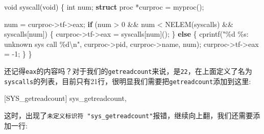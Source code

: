 \documentclass[
]{article}
\newenvironment{Shaded}{}{}
\newcommand{\ControlFlowTok}[1]{\textcolor[rgb]{0.00,0.44,0.13}{\textbf{#1}}}
\newcommand{\DataTypeTok}[1]{\textcolor[rgb]{0.56,0.13,0.00}{#1}}
\newcommand{\DecValTok}[1]{\textcolor[rgb]{0.25,0.63,0.44}{#1}}
\newcommand{\KeywordTok}[1]{\textcolor[rgb]{0.00,0.44,0.13}{\textbf{#1}}}
\newcommand{\NormalTok}[1]{#1}
\newcommand{\OperatorTok}[1]{\textcolor[rgb]{0.40,0.40,0.40}{#1}}
\newcommand{\SpecialCharTok}[1]{\textcolor[rgb]{0.25,0.44,0.63}{#1}}
\newcommand{\StringTok}[1]{\textcolor[rgb]{0.25,0.44,0.63}{#1}}
\begin{document}
\begin{Shaded}
	\begin{Highlighting}[]
		\DataTypeTok{void}\NormalTok{ syscall}\OperatorTok{(}\DataTypeTok{void}\OperatorTok{)}
		\OperatorTok{\{}
		\DataTypeTok{int}\NormalTok{ num}\OperatorTok{;}
		\KeywordTok{struct}\NormalTok{ proc }\OperatorTok{*}\NormalTok{curproc }\OperatorTok{=}\NormalTok{ myproc}\OperatorTok{();}

		\NormalTok{  num }\OperatorTok{=}\NormalTok{ curproc}\OperatorTok{{-}\textgreater{}}\NormalTok{tf}\OperatorTok{{-}\textgreater{}}\NormalTok{eax}\OperatorTok{;}
		\ControlFlowTok{if} \OperatorTok{(}\NormalTok{num }\OperatorTok{\textgreater{}} \DecValTok{0} \OperatorTok{\&\&}\NormalTok{ num }\OperatorTok{\textless{}}\NormalTok{ NELEM}\OperatorTok{(}\NormalTok{syscalls}\OperatorTok{)} \OperatorTok{\&\&}\NormalTok{ syscalls}\OperatorTok{[}\NormalTok{num}\OperatorTok{])}
		\OperatorTok{\{}
		\NormalTok{    curproc}\OperatorTok{{-}\textgreater{}}\NormalTok{tf}\OperatorTok{{-}\textgreater{}}\NormalTok{eax }\OperatorTok{=}\NormalTok{ syscalls}\OperatorTok{[}\NormalTok{num}\OperatorTok{]();}
		\OperatorTok{\}}
		\ControlFlowTok{else}
		\OperatorTok{\{}
		\NormalTok{    cprintf}\OperatorTok{(}\StringTok{"}\SpecialCharTok{\%d}\StringTok{ }\SpecialCharTok{\%s}\StringTok{: unknown sys call }\SpecialCharTok{\%d\textbackslash{}n}\StringTok{"}\OperatorTok{,}
		\NormalTok{            curproc}\OperatorTok{{-}\textgreater{}}\NormalTok{pid}\OperatorTok{,}\NormalTok{ curproc}\OperatorTok{{-}\textgreater{}}\NormalTok{name}\OperatorTok{,}\NormalTok{ num}\OperatorTok{);}
		\NormalTok{    curproc}\OperatorTok{{-}\textgreater{}}\NormalTok{tf}\OperatorTok{{-}\textgreater{}}\NormalTok{eax }\OperatorTok{=} \OperatorTok{{-}}\DecValTok{1}\OperatorTok{;}
		\OperatorTok{\}}
		\OperatorTok{\}}
	\end{Highlighting}
\end{Shaded}

还记得\texttt{eax}的内容吗？对于我们的\texttt{getreadcount}来说，是\texttt{22}，在上面定义了名为\texttt{syscalls}的列表，目前只有21行，很明显我们需要把\texttt{getreadcount}添加到这里:

\begin{Shaded}
	\begin{Highlighting}[]
		\OperatorTok{[}\NormalTok{SYS\_getreadcount}\OperatorTok{]}\NormalTok{ sys\_getreadcount}\OperatorTok{,}
	\end{Highlighting}
\end{Shaded}

这时，出现了\texttt{未定义标识符\ "sys\_getreadcount"}报错，继续向上翻，我们还需要添加一行:
\end{document}
